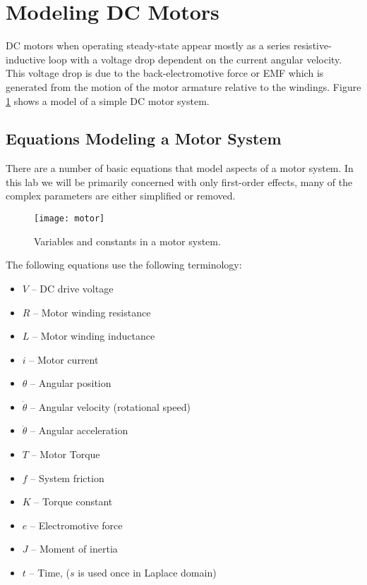\documentclass[openany,11pt,fleqn]{book} %
\begin{document}
\section{Modeling DC Motors}

DC motors when operating steady-state appear mostly as a series resistive-inductive loop with a voltage drop dependent on the current angular velocity. This voltage drop is due to the back-electromotive force or EMF which is generated from the motion of the motor armature relative to the windings. Figure \ref{motor_sys} shows a model of a simple DC motor system. 

\subsection{Equations Modeling a Motor System}

There are a number of basic equations that model aspects of a motor system. In this lab we will be primarily concerned with only first-order effects, many of the complex parameters are either simplified or removed. 

\begin{figure}[tb]
    \centering\texttt{[image: motor]}
    \caption{Variables and constants in a motor system.}
    \label{motor_sys}
\end{figure}

The following equations use the following terminology:
\begin{itemize}
    \item $V$ -- DC drive voltage
    \item $R$ -- Motor winding resistance
    \item $L$ -- Motor winding inductance 
    \item $i$ -- Motor current 
    \item $\theta$ -- Angular position
    \item $\dot{\theta}$ -- Angular velocity (rotational speed)
    \item $\ddot{\theta}$ -- Angular acceleration
    \item $T$ -- Motor Torque
    \item $f$ -- System friction
    \item $K$ -- Torque constant
    \item $e$ -- Electromotive force
    \item $J$ -- Moment of inertia
    \item $t$ -- Time, ($s$ is used once in Laplace domain) 
\end{itemize}
\end{document}

